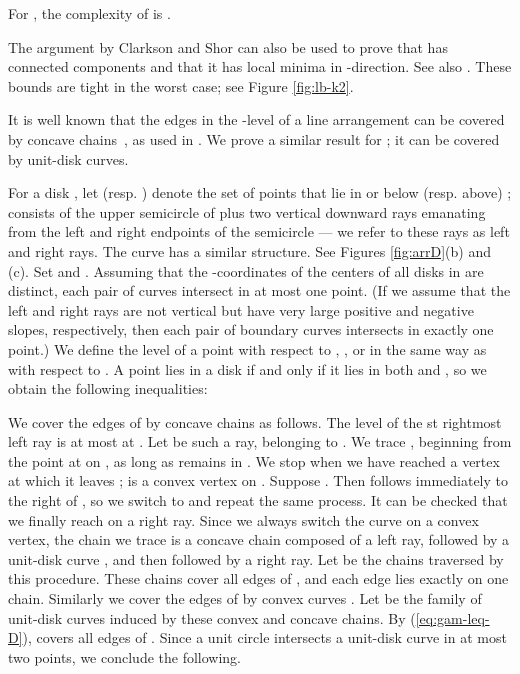 \documentclass[11pt]{myclass}
\begin{document}
\begin{lemma} \emph{\cite{CS89}} For , the complexity of  is .  
\label{lem:CS-nk}
\end{lemma}



\begin{remark}
The argument by Clarkson and Shor can also be used to prove that  has  connected components and that it has  local minima in -direction.  See also \cite{Cla93,Mat95}.  These bounds are tight in the worst case; see Figure \ref{fig:lb-k2}.
\end{remark}

\vspace{.1in}
It is well known that the edges in the -level of a line arrangement can be covered by  concave chains~\cite{Gus79}, as used in \cite{Dey98,Cha05}.  We prove a similar result for ; it can be covered by  unit-disk curves.  

For a disk , let  (resp. ) denote the set of points that lie in or below (resp. above) ;  consists of the upper semicircle of  plus two vertical downward rays emanating from the left and right endpoints of the semicircle --- we refer to these rays as left and right rays.  The curve  has a similar structure.  See Figures \ref{fig:arrD}(b) and (c).  Set  and .  Assuming that the -coordinates of the centers of all disks in  are distinct, each pair of curves  intersect in at most one point.  (If we assume that the left and right rays are not vertical but have very large positive and negative slopes, respectively, then each pair of boundary curves intersects in exactly one point.)  We define the level of a point with respect to , , or  in the same way as with respect to .  A point lies in a disk  if and only if it lies in both  and , so we obtain the following inequalities:



We cover the edges of  by  concave chains as follows.  The level of the st rightmost left ray is at most  at .  Let  be such a ray, belonging to .  We trace , beginning from the point at  on , as long as  remains in .  We stop when we have reached a vertex  at which it leaves ;  is a convex vertex on .  Suppose .  Then  follows  immediately to the right of , so we switch to  and repeat the same process.  It can be checked that we finally reach  on a right ray.  Since we always switch the curve on a convex vertex, the chain  we trace is a concave chain composed of a left ray, followed by a unit-disk curve , and then followed by a right ray.  Let  be the  chains traversed by this procedure.  These chains cover all edges of , and each edge lies exactly on one chain.  Similarly we cover the edges of  by  convex curves .  Let  be the family of unit-disk curves induced by these convex and concave chains.  By (\ref{eq:gam-leq-D}),  covers all edges of .  
Since a unit circle intersects a unit-disk curve in at most two points, we conclude the following.
\end{document}
